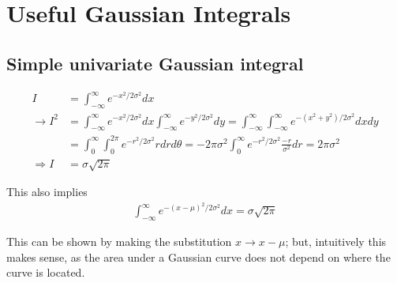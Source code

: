 \documentclass[/home/jesse/Analysis/FemtoAnalysis/AnalysisNotes/AnalysisNoteJBuxton.tex]{subfiles}
\begin{document}
\section{Useful Gaussian Integrals}
\label{App:GaussInt}

\subsection{Simple univariate Gaussian integral}

\begin{equation}
\begin{aligned}
I &= \int_{-\infty}^{\infty}e^{-x^{2}/2\sigma^{2}}dx \\
\rightarrow I^{2} &= \int_{-\infty}^{\infty}e^{-x^{2}/2\sigma^{2}}dx\int_{-\infty}^{\infty}e^{-y^{2}/2\sigma^{2}}dy = \int_{-\infty}^{\infty}\int_{-\infty}^{\infty}e^{-(x^{2}+y^{2})/2\sigma^{2}}dxdy \\
&= \int_{0}^{\infty}\int_{0}^{2\pi}e^{-r^{2}/2\sigma^{2}}rdrd\theta = -2\pi\sigma^{2}\int_{0}^{\infty}e^{-r^{2}/2\sigma^{2}}\frac{-r}{\sigma^{2}}dr = 2\pi\sigma^{2} \\
\Rightarrow I &= \sigma\sqrt{2\pi}
\end{aligned}
\label{eqn:Gauss1D}
\end{equation}

This also implies 
\begin{equation}
\begin{aligned}
\int_{-\infty}^{\infty}e^{-(x-\mu)^{2}/2\sigma^{2}}dx = \sigma\sqrt{2\pi}
\end{aligned}
\end{equation}

This can be shown by making the substitution $x \rightarrow x-\mu$; but, intuitively this makes sense, as the area under a Gaussian curve does not depend on where the curve is located.
\end{document}
